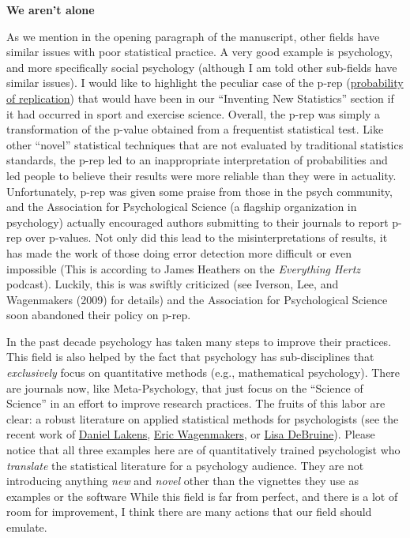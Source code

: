 \documentclass[
]{article}
\begin{document}
\textbf{We aren't alone}

As we mention in the opening paragraph of the manuscript, other fields
have similar issues with poor statistical practice. A very good example
is psychology, and more specifically social psychology (although I am
told other sub-fields have similar issues). I would like to highlight
the peculiar case of the p-rep
(\href{https://en.wikipedia.org/wiki/P-rep}{probability of replication})
that would have been in our ``Inventing New Statistics'' section if it
had occurred in sport and exercise science. Overall, the p-rep was
simply a transformation of the p-value obtained from a frequentist
statistical test. Like other ``novel'' statistical techniques that are
not evaluated by traditional statistics standards, the p-rep led to an
inappropriate interpretation of probabilities and led people to believe
their results were more reliable than they were in actuality.
Unfortunately, p-rep was given some praise from those in the psych
community, and the Association for Psychological Science (a flagship
organization in psychology) actually encouraged authors submitting to
their journals to report p-rep over p-values. Not only did this lead to
the misinterpretations of results, it has made the work of those doing
error detection more difficult or even impossible (This is according to
James Heathers on the \emph{Everything Hertz} podcast). Luckily, this is
was swiftly criticized (see Iverson, Lee, and Wagenmakers (2009) for
details) and the Association for Psychological Science soon abandoned
their policy on p-rep.

In the past decade psychology has taken many steps to improve their
practices. This field is also helped by the fact that psychology has
sub-disciplines that \emph{exclusively} focus on quantitative methods
(e.g., mathematical psychology). There are journals now, like
Meta-Psychology, that just focus on the ``Science of Science'' in an
effort to improve research practices. The fruits of this labor are
clear: a robust literature on applied statistical methods for
psychologists (see the recent work of
\href{https://journals.sagepub.com/doi/full/10.1177/2515245918770963}{Daniel
Lakens},
\href{https://link.springer.com/article/10.3758/s13423-017-1343-3}{Eric
Wagenmakers}, or \href{https://psyarxiv.com/xp5cy/}{Lisa DeBruine}).
Please notice that all three examples here are of quantitatively trained
psychologist who \emph{translate} the statistical literature for a
psychology audience. They are not introducing anything \emph{new} and
\emph{novel} other than the vignettes they use as examples or the
software While this field is far from perfect, and there is a lot of
room for improvement, I think there are many actions that our field
should emulate.
\end{document}

